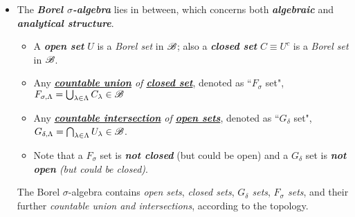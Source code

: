 \documentclass[11pt]{article}
\begin{document}
\begin{itemize}
\item \begin{remark}
The \emph{\textbf{Borel $\sigma$-algebra}} lies in between, which concerns both \emph{\textbf{algebraic}} and \emph{\textbf{analytical structure}}. 
\begin{itemize}
\item A \emph{\textbf{open set}} $U$ is a \emph{Borel set} in ${\mathscr B}$; also a \emph{\textbf{closed set}} $C\equiv U^{c}$ is a \emph{Borel set} in ${\mathscr B}$. 
\item Any \emph{\underline{\textbf{countable union}} of \underline{\textbf{closed set}}}, denoted as ``$F_{\sigma}$ set",  $F_{\sigma, \Lambda}= \bigcup_{\lambda\in \Lambda}C_{\lambda} \in {\mathscr B}$  
\item Any \emph{\underline{\textbf{countable intersection}} of \underline{\textbf{open sets}}}, denoted as ``$G_{\delta}$ set", $G_{\delta, \Lambda}= \bigcap_{\lambda\in \Lambda}U_{\lambda} \in {\mathscr B}$. 
\item Note that a $F_{\sigma}$ set is \emph{\textbf{not closed}} (but could be open) and a $G_{\delta}$ set is \emph{\textbf{not open} (but could be closed)}. 
\end{itemize}
The Borel $\sigma$-algebra contains \emph{open sets}, \emph{closed sets}, \emph{$G_{\delta}$ sets}, \emph{$F_{\sigma}$ sets}, and their further \emph{countable union and intersections}, according to the topology. 
\end{remark} 
\end{itemize}
\newpage
\end{document}
